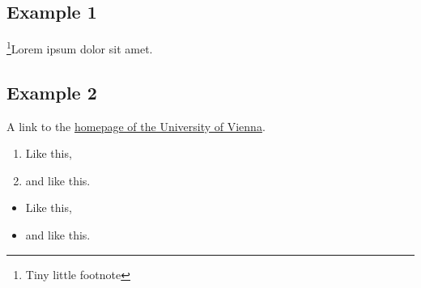 \documentclass[a4paper, 11pt]{article}          %
\begin{document}
    \subsection{Example 1}                          %

    \footnote{Tiny little footnote}Lorem ipsum dolor sit amet.

    \lipsum[1-1]

    \subsection{Example 2}                          %

    A link to the \hyperlink{https://www.univie.ac.at}{homepage of the University of Vienna}.
    \lipsum[1-1]

    \begin{enumerate}
        \item Like this,
        \item and like this.
    \end{enumerate}
    \begin{itemize}
        \item Like this,
        \item and like this.
    \end{itemize}

    \lipsum[1-1]

\end{document}
